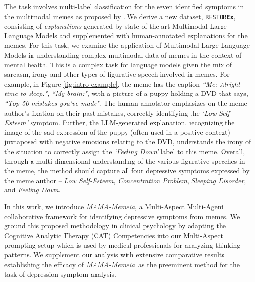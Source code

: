\documentclass[letterpaper]{article} %
\newcommand{\dataset}{\texttt{RESTOR\textbf{Ex}}}
\newcommand{\model}{\textit{MAMA-Memeia}}
\begin{document}
The task involves multi-label classification for the seven identified symptoms in the multimodal memes as proposed by \citet{Yadav-etal-2023-towards}. We derive a new dataset, \dataset, consisting of \textit{explanations} generated by state-of-the-art Multimodal Large Language Models and supplemented with human-annotated explanations for the memes. 
For this task, we examine the application of Multimodal Large Language Models in understanding complex multimodal data of memes in the context of mental health. This is a complex task for language models given the mix of sarcasm, irony and other types of figurative speech involved in memes.
For example, in Figure \ref{fig:intro-example}, the meme has the caption \textit{``Me: Alright time to sleep."}, \textit{``My brain:"}, with a picture of a puppy holding a DVD that says, \textit{``Top 50 mistakes you've made"}. %
The human annotator emphasizes on the meme author's fixation on their past mistakes, correctly identifying the \textit{`Low Self-Esteem'} symptom. Further, the %
LLM-generated explanation, recognizing the image of the sad expression of the puppy (often used in a positive context) juxtaposed with negative emotions relating to the DVD, %
understands the irony of the situation to correctly assign the \textit{`Feeling Down'} label to this meme. 
Overall, through a multi-dimensional understanding of the various figurative speeches in the meme, the method should capture all four depressive symptoms expressed by the meme author -- \textit{Low Self-Esteem}, \textit{Concentration Problem}, \textit{Sleeping Disorder}, and \textit{Feeling Down}.

In this work, we introduce \model, a Multi-Aspect Multi-Agent collaborative framework for identifying depressive symptoms from memes. We ground this proposed methodology in clinical psychology by adapting the Cognitive Analytic Therapy (CAT) Competencies \cite{parry_developing_2021} into our Multi-Aspect prompting setup which is used by medical professionals for analyzing thinking patterns. We supplement our analysis with extensive comparative results establishing the efficacy of \model\ as the preeminent method for the task of depression symptom analysis.
\end{document}
